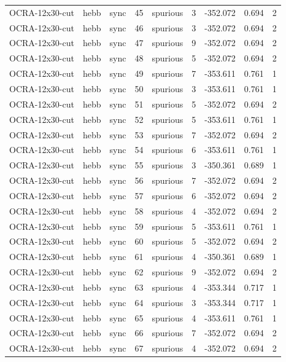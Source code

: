 \begin{tabular}{lllrlrrrr}
OCRA-12x30-cut & hebb & sync & 45 & spurious & 3 & -352.072 & 0.694 & 2 \\
OCRA-12x30-cut & hebb & sync & 46 & spurious & 3 & -352.072 & 0.694 & 2 \\
OCRA-12x30-cut & hebb & sync & 47 & spurious & 9 & -352.072 & 0.694 & 2 \\
OCRA-12x30-cut & hebb & sync & 48 & spurious & 5 & -352.072 & 0.694 & 2 \\
OCRA-12x30-cut & hebb & sync & 49 & spurious & 7 & -353.611 & 0.761 & 1 \\
OCRA-12x30-cut & hebb & sync & 50 & spurious & 3 & -353.611 & 0.761 & 1 \\
OCRA-12x30-cut & hebb & sync & 51 & spurious & 5 & -352.072 & 0.694 & 2 \\
OCRA-12x30-cut & hebb & sync & 52 & spurious & 5 & -353.611 & 0.761 & 1 \\
OCRA-12x30-cut & hebb & sync & 53 & spurious & 7 & -352.072 & 0.694 & 2 \\
OCRA-12x30-cut & hebb & sync & 54 & spurious & 6 & -353.611 & 0.761 & 1 \\
OCRA-12x30-cut & hebb & sync & 55 & spurious & 3 & -350.361 & 0.689 & 1 \\
OCRA-12x30-cut & hebb & sync & 56 & spurious & 7 & -352.072 & 0.694 & 2 \\
OCRA-12x30-cut & hebb & sync & 57 & spurious & 6 & -352.072 & 0.694 & 2 \\
OCRA-12x30-cut & hebb & sync & 58 & spurious & 4 & -352.072 & 0.694 & 2 \\
OCRA-12x30-cut & hebb & sync & 59 & spurious & 5 & -353.611 & 0.761 & 1 \\
OCRA-12x30-cut & hebb & sync & 60 & spurious & 5 & -352.072 & 0.694 & 2 \\
OCRA-12x30-cut & hebb & sync & 61 & spurious & 4 & -350.361 & 0.689 & 1 \\
OCRA-12x30-cut & hebb & sync & 62 & spurious & 9 & -352.072 & 0.694 & 2 \\
OCRA-12x30-cut & hebb & sync & 63 & spurious & 4 & -353.344 & 0.717 & 1 \\
OCRA-12x30-cut & hebb & sync & 64 & spurious & 3 & -353.344 & 0.717 & 1 \\
OCRA-12x30-cut & hebb & sync & 65 & spurious & 4 & -353.611 & 0.761 & 1 \\
OCRA-12x30-cut & hebb & sync & 66 & spurious & 7 & -352.072 & 0.694 & 2 \\
OCRA-12x30-cut & hebb & sync & 67 & spurious & 4 & -352.072 & 0.694 & 2 \\

\end{tabular}
